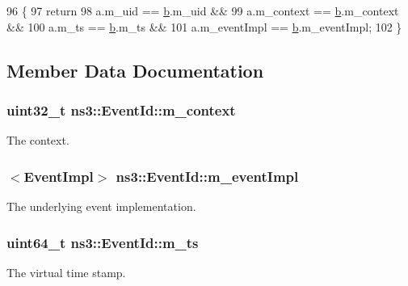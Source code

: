 \begin{DoxyCode}
96 \{
97   \textcolor{keywordflow}{return} 
98     a.m\_uid == \hyperlink{buildings__pathloss_8m_a21ad0bd836b90d08f4cf640b4c298e7c}{b}.m\_uid && 
99     a.m\_context == \hyperlink{buildings__pathloss_8m_a21ad0bd836b90d08f4cf640b4c298e7c}{b}.m\_context && 
100     a.m\_ts == \hyperlink{buildings__pathloss_8m_a21ad0bd836b90d08f4cf640b4c298e7c}{b}.m\_ts && 
101     a.m\_eventImpl == \hyperlink{buildings__pathloss_8m_a21ad0bd836b90d08f4cf640b4c298e7c}{b}.m\_eventImpl;
102 \}
\end{DoxyCode}


\subsection{Member Data Documentation}
\subsubsection[{\texorpdfstring{m\+\_\+context}{m_context}}]{\setlength{\rightskip}{0pt plus 5cm}uint32\+\_\+t ns3\+::\+Event\+Id\+::m\+\_\+context\hspace{0.3cm}{\ttfamily [private]}}\hypertarget{classns3_1_1EventId_ae865f27ce48282dea263d903765ebc9a}{}\label{classns3_1_1EventId_ae865f27ce48282dea263d903765ebc9a}
The context. 
\subsubsection[{\texorpdfstring{m\+\_\+event\+Impl}{m_eventImpl}}]{$<${\bf Event\+Impl}$>$ ns3\+::\+Event\+Id\+::m\+\_\+event\+Impl\hspace{0.3cm}{\ttfamily [private]}}\hypertarget{classns3_1_1EventId_aedc50b4a5bc760d6b3f6842ff4f48f52}{}\label{classns3_1_1EventId_aedc50b4a5bc760d6b3f6842ff4f48f52}
The underlying event implementation. 
\subsubsection[{\texorpdfstring{m\+\_\+ts}{m_ts}}]{\setlength{\rightskip}{0pt plus 5cm}uint64\+\_\+t ns3\+::\+Event\+Id\+::m\+\_\+ts\hspace{0.3cm}{\ttfamily [private]}}\hypertarget{classns3_1_1EventId_a56cb2ce4649140a91c0cb7bd7f30e736}{}\label{classns3_1_1EventId_a56cb2ce4649140a91c0cb7bd7f30e736}
The virtual time stamp. 
